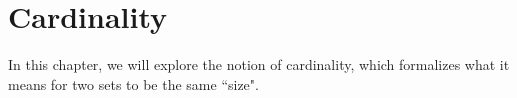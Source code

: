 \chapter{Cardinality}

In this chapter, we will explore the notion of cardinality, which formalizes what it means for two sets to be the same ``size".